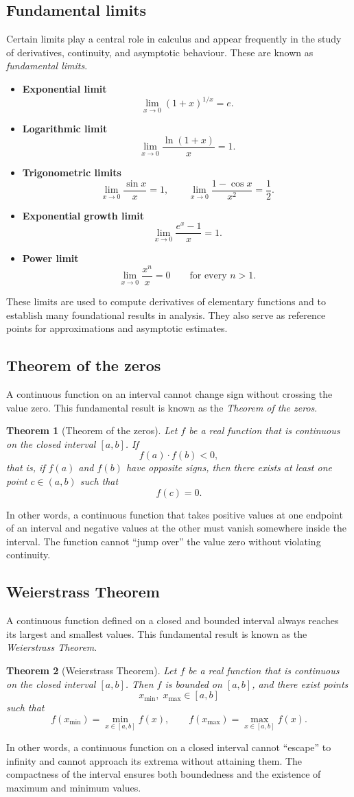 \documentclass[11pt,a4paper]{article}
\theoremstyle{definition} \newtheorem{definition}{Definition} \theoremstyle{plain} \newtheorem{theorem}{Theorem}
\begin{document}
\subsection{Fundamental limits}
Certain limits play a central role in calculus and appear frequently in the study of derivatives, continuity, and asymptotic behaviour.
These are known as \emph{fundamental limits}.
\begin{itemize}
\item \textbf{Exponential limit}
\[
\lim_{x \to 0} (1+x)^{1/x} = e.
\]
\item \textbf{Logarithmic limit}
\[
\lim_{x \to 0} \frac{\ln(1+x)}{x} = 1.
\]
\item \textbf{Trigonometric limits}
\[
\lim_{x \to 0} \frac{\sin x}{x} = 1,
\qquad
\lim_{x \to 0} \frac{1 - \cos x}{x^2} = \frac{1}{2}.
\]
\item \textbf{Exponential growth limit}
\[
\lim_{x \to 0} \frac{e^x - 1}{x} = 1.
\]
\item \textbf{Power limit}
\[
\lim_{x \to 0} \frac{x^n}{x} = 0 \qquad \text{for every } n>1.
\]
\end{itemize}
These limits are used to compute derivatives of elementary functions and to establish many foundational results in analysis.
They also serve as reference points for approximations and asymptotic estimates.
\subsection{Theorem of the zeros}
A continuous function on an interval cannot change sign without crossing the value zero.
This fundamental result is known as the \emph{Theorem of the zeros}.
\begin{theorem}[Theorem of the zeros]\label{thm:zeros} Let $f$ be a real function that is continuous on the closed interval $[a,b]$. If
\[ f(a)\cdot f(b) < 0, \]
that is, if $f(a)$ and $f(b)$ have opposite signs, then there exists at least one point $c \in (a,b)$ such that
\[ f(c) = 0. \]
\end{theorem}
In other words, a continuous function that takes positive values at one endpoint of an interval and negative values at the other must vanish somewhere inside the interval.
The function cannot ``jump over'' the value zero without violating continuity.
\subsection{Weierstrass Theorem}
A continuous function defined on a closed and bounded interval always reaches its largest and smallest values.
This fundamental result is known as the \emph{Weierstrass Theorem}.
\begin{theorem}[Weierstrass Theorem]\label{thm:weierstrass} Let $f$ be a real function that is continuous on the closed interval $[a,b]$. Then $f$ is bounded on $[a,b]$, and there exist points
\[ x_{\min},\; x_{\max} \in [a,b] \]
such that
\[ f(x_{\min}) = \min_{x \in [a,b]} f(x), \qquad f(x_{\max}) = \max_{x \in [a,b]} f(x). \]
\end{theorem}
In other words, a continuous function on a closed interval cannot ``escape'' to infinity and cannot approach its extrema without attaining them.
The compactness of the interval ensures both boundedness and the existence of maximum and minimum values.
\end{document}
